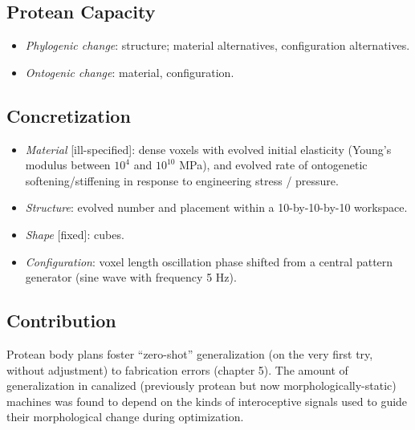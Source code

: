 \subsection{Protean Capacity}

\begin{itemize}
    \item \textit{Phylogenic change}: structure; material alternatives, configuration alternatives.
    \item \textit{Ontogenic change}: material, configuration.
\end{itemize}


\subsection{Concretization}


\begin{itemize}
    \item \textit{Material} [ill-specified]: dense voxels with evolved initial elasticity (Young's modulus between $10^4$ and $10^{10}$ MPa), and evolved rate of ontogenetic softening/stiffening in response to engineering stress / pressure.
    \item \textit{Structure}: evolved number and placement within a 10-by-10-by-10 workspace.
    \item \textit{Shape} [fixed]: cubes.
    \item \textit{Configuration}: voxel length oscillation phase shifted from a central pattern generator (sine wave with frequency 5 Hz).
\end{itemize}




\subsection{Contribution}

Protean body plans foster ``zero-shot'' generalization (on the very first try, without adjustment) to fabrication errors (chapter 5).
The amount of generalization in canalized (previously protean but now morphologically-static) machines was found to depend on the kinds of interoceptive signals used to guide their morphological change during optimization.

